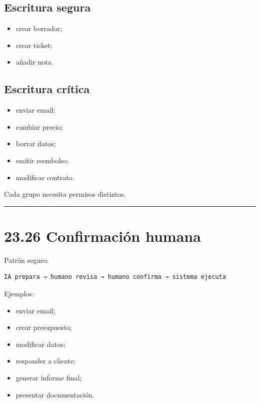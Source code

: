 \subsection{Escritura segura}\label{escritura-segura}

\begin{itemize}
\tightlist
\item
  crear borrador;
\item
  crear ticket;
\item
  añadir nota.
\end{itemize}

\subsection{Escritura crítica}\label{escritura-cruxedtica}

\begin{itemize}
\tightlist
\item
  enviar email;
\item
  cambiar precio;
\item
  borrar datos;
\item
  emitir reembolso;
\item
  modificar contrato.
\end{itemize}

Cada grupo necesita permisos distintos.

\begin{center}\rule{0.5\linewidth}{0.5pt}\end{center}

\section{23.26 Confirmación humana}\label{confirmaciuxf3n-humana}

Patrón seguro:

\begin{lstlisting}
IA prepara → humano revisa → humano confirma → sistema ejecuta
\end{lstlisting}

Ejemplos:

\begin{itemize}
\tightlist
\item
  enviar email;
\item
  crear presupuesto;
\item
  modificar datos;
\item
  responder a cliente;
\item
  generar informe final;
\item
  presentar documentación.
\end{itemize}

